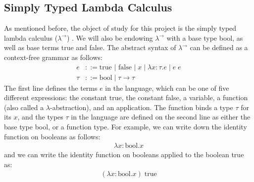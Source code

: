 \documentclass[12pt, letterpaper]{article}
\begin{document}
\subsection{Simply Typed Lambda Calculus}

As mentioned before, the object of study for this project is the simply typed lambda calculus ($\lambda^{\to}$) \cite{church_1940}. We will also be endowing $\lambda^{\to}$ with a base type bool, as well as base terms true and false. The abstract syntax of $\lambda^{\to}$ can be defined as a context-free grammar as follows:
\begin{align*}
e &::= \text{true } | \text{ false } | \; x \;| \;\lambda x:\tau.e \; | \; e
\;e\\
\tau &::= \text{bool}\;|\;\tau \to \tau
\end{align*}
The first line defines the terms $e$ in the language, which can be one of five different expressions: the constant true, the constant false, a variable, a function (also called a $\lambda$-abstraction), and an application. The function binds a type $\tau$ for its $x$, and the types $\tau$  in the language are defined on the second line as either the base type bool, or a function type. For example, we can write down the identity function on booleans as follows:
\begin{align*}
\lambda x : \text{bool} . x
\end{align*}
and we can write the identity function on booleans applied to the boolean true as:
\begin{align*}
(\lambda x : \text{bool} . x)\;\text{true}
\end{align*}
\end{document}
